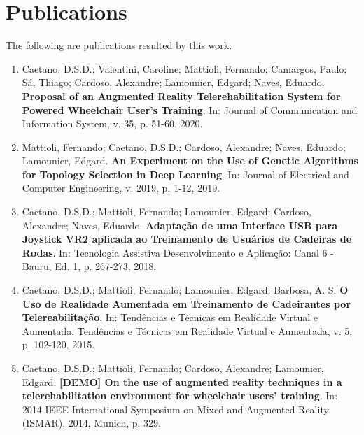\newpage
\thispagestyle{empty}
\chapter*{Publications}

The following are publications resulted by this work:

\begin{enumerate}
\item \indent Caetano, D.S.D.; Valentini, Caroline; Mattioli, Fernando; Camargos, Paulo; Sá, Thiago;  Cardoso, Alexandre; Lamounier, Edgard; Naves, Eduardo. \textbf{ Proposal of an Augmented Reality Telerehabilitation System for Powered Wheelchair User’s Training}. 
In: Journal of Communication and Information System, v. 35, p. 51-60, 2020.

\item \indent Mattioli, Fernando; Caetano, D.S.D.; Cardoso, Alexandre; Naves, Eduardo; Lamounier, Edgard.  \textbf{ An Experiment on the Use of Genetic Algorithms for Topology Selection in Deep Learning}. In: Journal of Electrical and Computer Engineering, v. 2019, p. 1-12, 2019.

\item \indent Caetano, D.S.D.; Mattioli, Fernando; Lamounier, Edgard; Cardoso, Alexandre; Naves, Eduardo.   \textbf{Adaptação de uma Interface USB para Joystick VR2 aplicada ao Treinamento de Usuários de Cadeiras de Rodas}. In: Tecnologia Assistiva Desenvolvimento e Aplicação: Canal 6 - Bauru, Ed. 1, p. 267-273, 2018.


\item \indent Caetano, D.S.D.; Mattioli, Fernando; Lamounier, Edgard; Barbosa, A. S. \textbf{O Uso de Realidade Aumentada em Treinamento de Cadeirantes por Telereabilita{\c c}{\~a}o}. In: Tend{\^e}ncias e T{\'e}cnicas em Realidade Virtual e Aumentada. Tend{\^e}ncias e T{\'e}cnicas em Realidade Virtual e Aumentada, v. 5, p. 102-120, 2015.

\item \indent Caetano, D.S.D.; Mattioli, Fernando; Cardoso, Alexandre; Lamounier, Edgard.  \textbf{ [DEMO] On the use of augmented reality techniques in a telerehabilitation environment for wheelchair users' training}. In: 2014 IEEE International Symposium on Mixed and Augmented Reality (ISMAR), 2014, Munich, p. 329.
\end{enumerate}

\newpage



